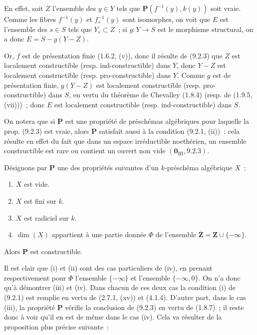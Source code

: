 En effet, soit $Z$ l'ensemble des $y\in Y$ tels que
$\mathbf P(f^{-1}(y),k(y))$ soit vraie. Comme les fibres $f^{-1}(y)$ et
$f_s^{-1}(y)$ sont isomorphes, on voit que $E$ est l'ensemble des $s\in S$
tels que $Y_s\subset Z$~; si $g:Y\to S$ est le morphisme structural, on a
donc $E=S-g(Y-Z)$.

Or, $f$ est de présentation finie (1.6.2, (v)), donc il résulte de (9.2.3) que
$Z$ est localement constructible (resp. ind-constructible) dans $Y$, donc
$Y-Z$ est localement constructible (resp. pro-constructible) dans $Y$. Comme
$g$ est de présentation finie, $g(Y-Z)$ est localement constructible
(resp. pro-constructible) dans $S$, en vertu du théorème de Chevalley (1.8.4)
(resp. de (1.9.5, (vii)))~; donc $E$ est localement constructible
(resp. ind-constructible) dans $S$.

\begin{remark}[9.2.5]
\label{IV.9.2.5-fr}
On notera que si $\mathbf P$ est une propriété de préschémas algébriques pour
laquelle la prop. (9.2.3) est vraie, alors $\mathbf P$ satisfait aussi à la
condition (9.2.1, (ii))~: cela résulte en effet du fait que dans un espace
irréductible noethérien, un ensemble constructible est rare ou contient un
ouvert non vide $(\mathbf 0_{\mathrm{III}},9.2.3)$.
\end{remark}

\begin{proposition}[9.2.6]
\label{IV.9.2.6-fr}
Désignons par $\mathbf P$ une des propriétés suivantes d'un $k$-préschéma
algébrique $X$~:
\begin{enumerate}[label=(\roman*)]
  \item $X$ est vide.
  \item $X$ est fini sur $k$.
  \item $X$ est radiciel sur $k$.
  \item $\dim(X)$ appartient à une partie donnée $\Phi$ de l'ensemble
  $\overline{\mathbf Z}=\mathbf Z\cup\{-\infty\}$.
\end{enumerate}
Alors $\mathbf P$ est constructible.
\end{proposition}

Il est clair que (i) et (ii) sont des cas particuliers de (iv), en prenant
respectivement pour $\Phi$ l'ensemble $\{-\infty\}$ et l'ensemble
$\{-\infty,0\}$. On n'a donc qu'à démontrer (iii) et (iv). Dans chacun de ces
deux cas la condition (i) de (9.2.1) est remplie en vertu de (2.7.1, (xv)) et
(4.1.4). D'autre part, dans le cas (iii), la propriété $\mathbf P$ vérifie la
conclusion de (9.2.3) en vertu de (1.8.7)~; il reste donc à voir qu'il en est de
même dans le cas (iv). Cela va résulter de la proposition plus précise
suivante~:


